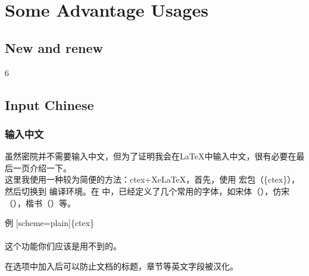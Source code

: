 \section{Some Advantage Usages}
\begin{frame}
\end{frame}

\subsection{New and renew}

\begin{frame}

\end{frame}
6
\subsection{Input Chinese}

\begin{frame}
	\songti
	\frametitle{输入中文}
	\qquad 虽然密院并不需要输入中文，但为了证明我会在\LaTeX 中输入中文，很有必要在最后一页介绍一下。\\
	\qquad 这里我使用一种较为简便的方法：ctex+XeLaTeX，首先，使用  宏包（\{ctex\}），然后切换到  编译环境。在  中，已经定义了几个常用的字体，如宋体（），仿宋（），楷书（）等。
	\begin{exampleblock}{例}
		[scheme=plain]\{ctex\}\\
		\\
		这个功能你们应该是用不到的。
	\end{exampleblock}
	在选项中加入\structure{[scheme=plain]}后可以防止文档的标题，章节等英文字段被汉化。
\end{frame}
